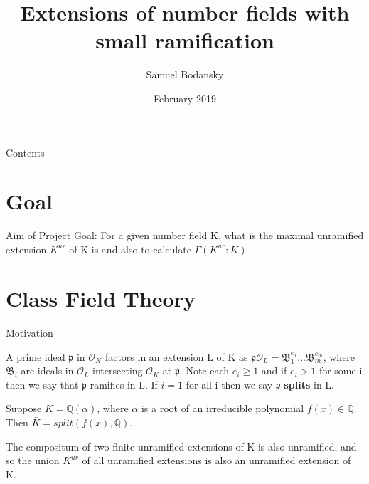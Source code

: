 \documentclass[10pt]{beamer}
\title[Part C Dissertation] %
{Extensions of number fields with small ramification}
\subtitle
{}
\author %
{Samuel Bodansky}
\institute %
{
  University of Oxford
  }
\date %
{February 2019}
\theoremstyle{plain} %
\begin{document}
\begin{frame}
  \titlepage
\end{frame}
\begin{frame}{Contents}
\tableofcontents
\end{frame}

\section{Goal}
\begin{frame}{Aim of Project}
Goal: For a given number field K, what is the maximal unramified extension $K^{ur}$ of K is and also to calculate $\Gamma(K^{ur}:K)$

\end{frame}

\section{Class Field Theory}

\begin{frame}{Motivation}
\pause

\begin{definition}[Ramification]
A prime ideal $\mathfrak{p}$ in $\mathcal{O}_K$ factors in an extension L of K as
$\mathfrak{p}\mathcal{O}_L=\mathfrak{B}_1^{e_1}...\mathfrak{B}_m^{e_m}$, where $\mathfrak{B}_i$ are ideals in $\mathcal{O}_L$ intersecting $\mathcal{O}_K$ at $\mathfrak{p}$. Note each $e_i\geq1$ and if $e_i>1$ for some i then we say that $\mathfrak{p}$ ramifies in L. If $i=1$ for all i then we say $\mathfrak{p}$ \textbf{splits} in L.
\end{definition}
\pause
\begin{theorem}
  Suppose $K=\mathbb{Q}(\alpha)$, where $\alpha$ is a root of an irreducible polynomial $f(x) \in \mathbb{Q}$. Then $\bar{K} = split(f(x),\mathbb{Q})$.
\end{theorem}
\pause
    \begin{theorem}
The compositum of two finite unramified extensions of K is also unramified, and so the union $K^{ur}$ of all unramified extensions is also an unramified extension of K.
\end{theorem}
\end{frame}
\end{document}
